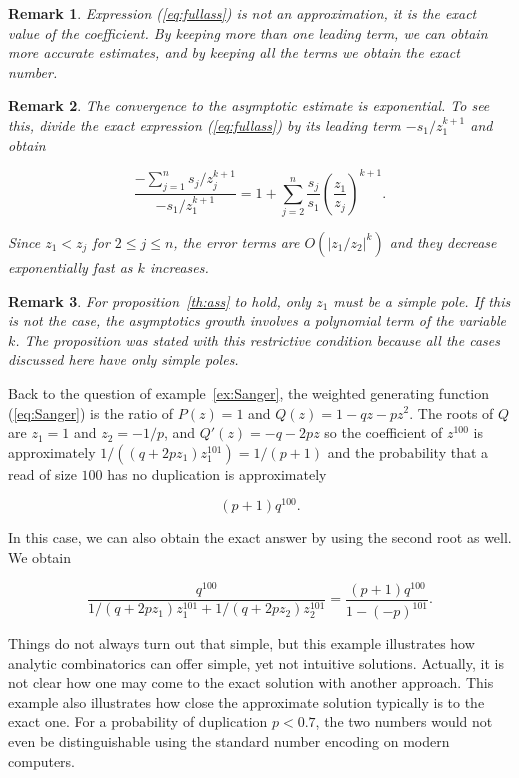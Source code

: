 \documentclass{article}
\newtheorem{remark}{Remark}
\begin{document}
\begin{remark}
Expression (\ref{eq:fullass}) is not an approximation, it is the exact
value of the coefficient. By keeping more than one leading term, we can
obtain more accurate estimates, and by keeping all the terms we obtain the
exact number.
\end{remark}

\begin{remark}
The convergence to the asymptotic estimate is exponential. To see this,
divide the exact expression (\ref{eq:fullass}) by its leading term
$-s_1/z_1^{k+1}$ and obtain

\begin{equation*}
\frac{-\sum_{j=1}^n s_j/z_j^{k+1}}{-s_1/z_1^{k+1}} = 1 + \sum_{j=2}^n
\frac{s_j}{s_1} \left( \frac{z_1}{z_j} \right)^{k+1}.
\end{equation*}

Since $z_1 < z_j$ for $2 \leq j \leq n$, the error terms are
$O(|z_1/z_2|^k)$ and they decrease exponentially fast as $k$ increases.
\end{remark}

\begin{remark}
For proposition~\ref{th:ass} to hold, only $z_1$ must be a simple pole. If
this is not the case, the asymptotics growth involves a polynomial term of
the variable $k$. The proposition was stated with this restrictive
condition because all the cases discussed here have only simple poles.
\end{remark}

Back to the question of example~\ref{ex:Sanger}, the weighted generating
function (\ref{eq:Sanger}) is the ratio of $P(z) = 1$ and $Q(z) =
1-qz-pz^2$. The roots of $Q$ are $z_1 = 1$ and $z_2 = -1/p$, and $Q'(z) =
-q -2pz$ so the coefficient of $z^{100}$ is approximately
$1/((q+2pz_1)z_1^{101}) = 1/(p+1)$ and the probability that a read of size
$100$ has no duplication is approximately

\begin{equation*}
(p+1)q^{100}.
\end{equation*}

In this case, we can also obtain the exact answer by using the second root
as well. We obtain

\begin{equation*}
\frac{q^{100}}{1/(q+2pz_1)z_1^{101} + 1/(q+2pz_2)z_2^{101}} =
\frac{(p+1)q^{100}}{1-(-p)^{101}}.
\end{equation*}

Things do not always turn out that simple, but this example illustrates
how analytic combinatorics can offer simple, yet not intuitive solutions.
Actually, it is not clear how one may come to the exact solution with
another approach. This example also illustrates how close the approximate
solution typically is to the exact one. For a probability of duplication
$p < 0.7$, the two numbers would not even be distinguishable using the
standard number encoding on modern computers.
\end{document}
